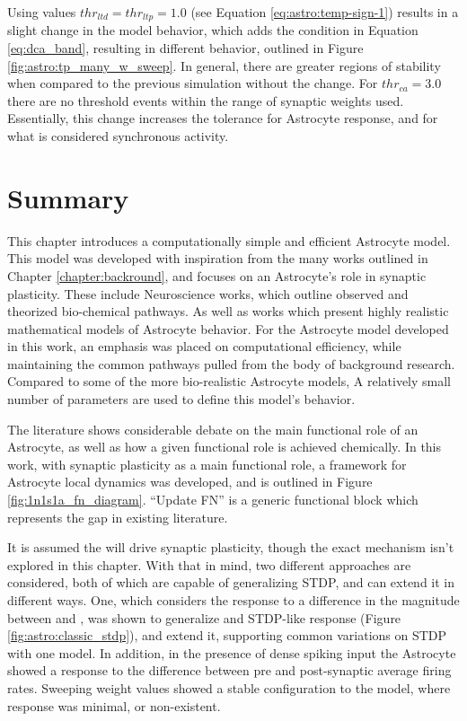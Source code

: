 Using values $thr_{ltd}=thr_{ltp}=1.0$ (see Equation \ref{eq:astro:temp-sign-1})
results in a slight change in the model behavior, which adds the condition in
Equation \ref{eq:dca_band}, resulting in different behavior, outlined in Figure
\ref{fig:astro:tp_many_w_sweep}. In general, there are greater regions of
stability when compared to the previous simulation without the
change. For $thr_{ca}=3.0$ there are no threshold events within the range of
synaptic weights used. Essentially, this change increases the tolerance for
Astrocyte response, and for what is considered synchronous activity.


\section{Summary}
This chapter introduces a computationally simple and efficient Astrocyte
model. This model was developed with inspiration from the many works outlined in
Chapter \ref{chapter:backround}, and focuses on an Astrocyte's role in synaptic
plasticity. These include Neuroscience works, which outline observed and
theorized bio-chemical pathways. As well as works which present highly realistic
mathematical models of Astrocyte behavior. For the Astrocyte model developed in
this work, an emphasis was placed on computational efficiency, while maintaining
the common pathways pulled from the body of background research.  Compared to
some of the more bio-realistic Astrocyte models, A relatively small number of
parameters are used to define this model's behavior.

The literature shows considerable debate on the main functional role of an
Astrocyte, as well as how a given functional role is achieved chemically. In
this work, with synaptic plasticity as a main functional role, a framework for
Astrocyte local dynamics was developed, and is outlined in Figure
\ref{fig:1n1s1a_fn_diagram}. ``Update FN'' is a generic functional block which
represents the gap in existing literature.

It is assumed the \ca will drive synaptic plasticity, though the exact mechanism
isn't explored in this chapter. With that in mind, two different approaches
are considered, both of which are capable of generalizing STDP, and can extend
it in different ways. One, which considers the \ca response to a difference in
the magnitude between \ipt and \kp, was shown to generalize and STDP-like
response (Figure \ref{fig:astro:classic_stdp}), and extend it, supporting common
variations on STDP with one model. In addition, in the presence of dense spiking
input the Astrocyte showed a response to the difference between pre and
post-synaptic average firing rates. Sweeping weight values showed a stable
configuration to the model, where \ca response was minimal, or non-existent.

